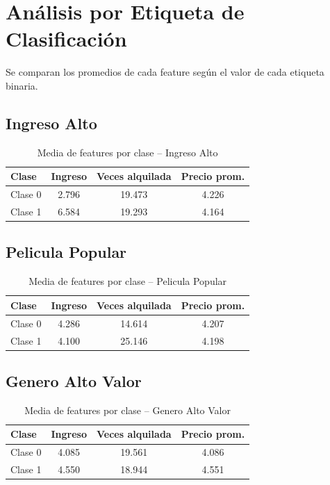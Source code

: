 \documentclass[12pt,a4paper]{article}
\begin{document}
\section{An\'alisis por Etiqueta de Clasificaci\'on}
Se comparan los promedios de cada feature seg\'un el valor de cada etiqueta binaria.
\subsection{Ingreso Alto}
\begin{table}[H]\centering
  \caption{Media de features por clase -- Ingreso Alto}
  \begin{tabular}{lccc}\toprule
    \textbf{Clase} & \textbf{Ingreso} & \textbf{Veces alquilada} & \textbf{Precio prom.}\\\midrule
    Clase 0 & 2.796 & 19.473 & 4.226 \\
    Clase 1 & 6.584 & 19.293 & 4.164 \\
  \bottomrule\end{tabular}
\end{table}
\subsection{Pelicula Popular}
\begin{table}[H]\centering
  \caption{Media de features por clase -- Pelicula Popular}
  \begin{tabular}{lccc}\toprule
    \textbf{Clase} & \textbf{Ingreso} & \textbf{Veces alquilada} & \textbf{Precio prom.}\\\midrule
    Clase 0 & 4.286 & 14.614 & 4.207 \\
    Clase 1 & 4.100 & 25.146 & 4.198 \\
  \bottomrule\end{tabular}
\end{table}
\subsection{Genero Alto Valor}
\begin{table}[H]\centering
  \caption{Media de features por clase -- Genero Alto Valor}
  \begin{tabular}{lccc}\toprule
    \textbf{Clase} & \textbf{Ingreso} & \textbf{Veces alquilada} & \textbf{Precio prom.}\\\midrule
    Clase 0 & 4.085 & 19.561 & 4.086 \\
    Clase 1 & 4.550 & 18.944 & 4.551 \\
  \bottomrule\end{tabular}
\end{table}
\end{document}
